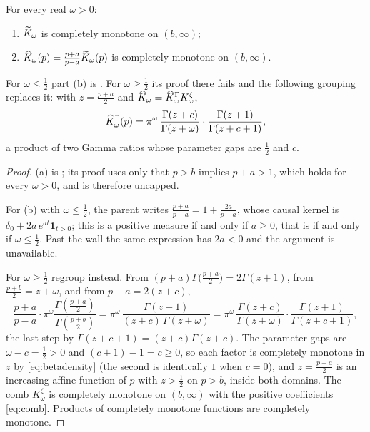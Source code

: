 \begin{proposition}\label{prop:cmuncapped}
For every real $\omega>0$:
\begin{enumerate}
\item[(a)] $\widetilde K_\omega$ is completely monotone on $(b,\infty)$;
\item[(b)] $\widehat K_\omega(p)=\frac{p+a}{p-a}\widetilde K_\omega(p)$ is completely monotone on
 $(b,\infty)$.
\end{enumerate}
For $\omega\le\frac12$ part (b) is \cite[Prop.~3.6]{Markov}. For
$\omega\ge\frac12$ its proof there fails and the following grouping replaces it:
with $z=\frac{p+a}2$ and $\widehat K_\omega=\widehat K^\Gamma_\omega K^\zeta_\omega$,
\begin{equation}\label{eq:regroup}
 \widehat K^\Gamma_\omega(p)
 =\pi^\omega\,\frac{\Gamma(z+c)}{\Gamma(z+\omega)}\cdot
 \frac{\Gamma(z+1)}{\Gamma(z+c+1)} ,
\end{equation}
a product of two Gamma ratios whose parameter gaps are $\frac12$ and $c$.
\end{proposition}

\begin{proof}
(a) is \cite[Prop.~3.2]{Markov}; its proof uses only that $p>b$ implies
$p+a>1$, which holds for every $\omega>0$, and is therefore uncapped.

For (b) with $\omega\le\frac12$, the parent writes
$\frac{p+a}{p-a}=1+\frac{2a}{p-a}$, whose causal kernel is
$\delta_0+2a\,e^{at}\mathbf 1_{t>0}$; this is a positive measure if and only if
$a\ge0$, that is if and only if $\omega\le\frac12$. Past the wall the same
expression has $2a<0$ and the argument is unavailable.

For $\omega\ge\frac12$ regroup instead. From
$(p+a)\Gamma\!\big(\frac{p+a}2\big)=2\Gamma(z+1)$, from $\frac{p+b}2=z+\omega$,
and from $p-a=2(z+c)$,
\[
 \frac{p+a}{p-a}\cdot\pi^\omega\frac{\Gamma(\frac{p+a}2)}{\Gamma(\frac{p+b}2)}
 =\pi^\omega\,\frac{\Gamma(z+1)}{(z+c)\,\Gamma(z+\omega)}
 =\pi^\omega\,\frac{\Gamma(z+c)}{\Gamma(z+\omega)}\cdot
 \frac{\Gamma(z+1)}{\Gamma(z+c+1)},
\]
the last step by $\Gamma(z+c+1)=(z+c)\Gamma(z+c)$. The parameter gaps are
$\omega-c=\frac12>0$ and $(c+1)-1=c\ge0$, so each factor is completely monotone
in $z$ by \eqref{eq:betadensity} (the second is identically $1$ when $c=0$), and
$z=\frac{p+a}2$ is an increasing affine function of $p$ with $z>\frac12$ on
$p>b$, inside both domains. The comb $K^\zeta_\omega$ is completely monotone on
$(b,\infty)$ with the positive coefficients \eqref{eq:comb}. Products of
completely monotone functions are completely monotone.
\end{proof}

